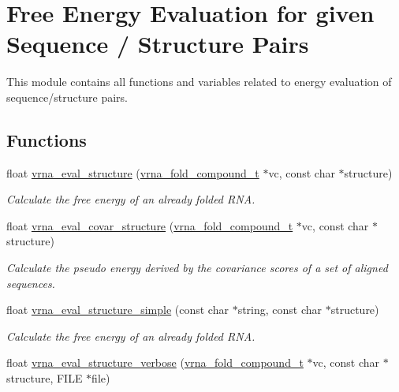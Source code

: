 \hypertarget{group__eval}{}\section{Free Energy Evaluation for given Sequence / Structure Pairs}
\label{group__eval}


This module contains all functions and variables related to energy evaluation of sequence/structure pairs.  


\subsection*{Functions}
\begin{DoxyCompactItemize}
\item 
float \hyperlink{group__eval_ga58f199f1438d794a265f3b27fc8ea631}{vrna\+\_\+eval\+\_\+structure} (\hyperlink{group__fold__compound_ga1b0cef17fd40466cef5968eaeeff6166}{vrna\+\_\+fold\+\_\+compound\+\_\+t} $\ast$vc, const char $\ast$structure)
\begin{DoxyCompactList}\small\item\em Calculate the free energy of an already folded R\+N\+A. \end{DoxyCompactList}\item 
float \hyperlink{group__eval_ga6cea75c0eb9857fb59172be54cab09e0}{vrna\+\_\+eval\+\_\+covar\+\_\+structure} (\hyperlink{group__fold__compound_ga1b0cef17fd40466cef5968eaeeff6166}{vrna\+\_\+fold\+\_\+compound\+\_\+t} $\ast$vc, const char $\ast$structure)
\begin{DoxyCompactList}\small\item\em Calculate the pseudo energy derived by the covariance scores of a set of aligned sequences. \end{DoxyCompactList}\item 
float \hyperlink{group__eval_gab6930f446d04761454d033680fbf7909}{vrna\+\_\+eval\+\_\+structure\+\_\+simple} (const char $\ast$string, const char $\ast$structure)
\begin{DoxyCompactList}\small\item\em Calculate the free energy of an already folded R\+N\+A. \end{DoxyCompactList}\item 
float \hyperlink{group__eval_ga0928d699d310178f84ee2351034e5cb5}{vrna\+\_\+eval\+\_\+structure\+\_\+verbose} (\hyperlink{group__fold__compound_ga1b0cef17fd40466cef5968eaeeff6166}{vrna\+\_\+fold\+\_\+compound\+\_\+t} $\ast$vc, const char $\ast$structure, F\+I\+L\+E $\ast$file)

\end{DoxyCompactItemize}
